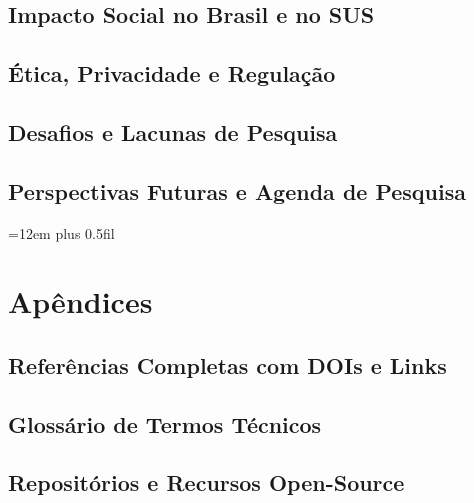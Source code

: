 \documentclass[12pt,a4paper,oneside,openright]{abntex2}
\theoremstyle{definition}
\begin{document}
\chapter{Impacto Social no Brasil e no SUS} \label{ch:impacto}

\chapter{Ética, Privacidade e Regulação} \label{ch:etica}

\chapter{Desafios e Lacunas de Pesquisa} \label{ch:desafios}

\chapter{Perspectivas Futuras e Agenda de Pesquisa} \label{ch:futuro}


\postextual

\emergencystretch=12em
\rightskip=0pt plus 0.5fil



\part*{Apêndices}

\chapter{Referências Completas com DOIs e Links}

\chapter{Glossário de Termos Técnicos}

\chapter{Repositórios e Recursos Open-Source}

\end{document}
